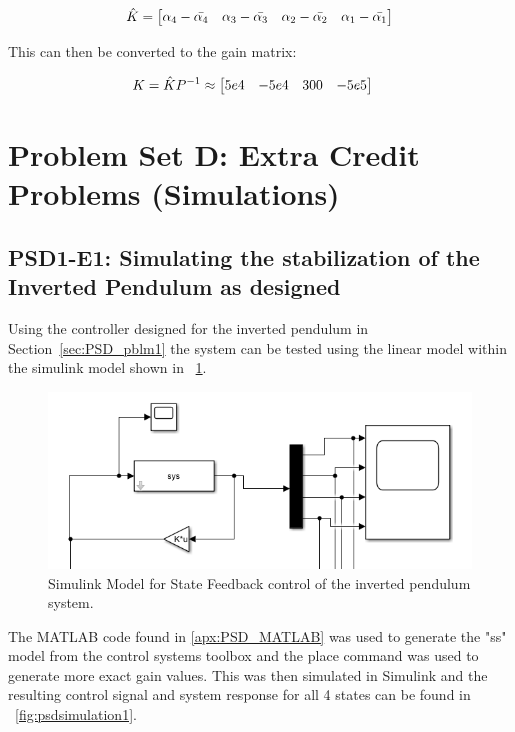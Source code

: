 \documentclass[]{article}
\newcommand{\sectionname}{Section}
\begin{document}
		\begin{equation}
			\hat{K} = \mqty[\alpha_4 - \bar{\alpha_4} & \alpha_3 - \bar{\alpha_3} & \alpha_2 - \bar{\alpha_2} & \alpha_1 - \bar{\alpha_1}]
		\end{equation}
		
		This can then be converted to the gain matrix:
		
		\begin{equation}
			\begin{aligned}
				K &= \hat{K} P^{-1} \approx \mqty[5e4&-5e4&300&-5e5] 
			\end{aligned}
			\label{eq:pendulum_state_feedback_K}
		\end{equation}





\newpage
\appendix

\section{Problem Set D: Extra Credit Problems (Simulations)}

	\subsection{PSD1-E1: Simulating the stabilization of the Inverted Pendulum as designed}
		Using the controller designed for the inverted pendulum in \sectionname \ \ref{sec:PSD_pblm1} the system can be tested using the linear model within the simulink model shown in \figurename \ \ref{fig:psdsimulinkmodel1}.
		
		\begin{figure}[h]
			\centering
			\includegraphics[width=1\linewidth]{Fig/PSD_SimulinkModel_1}
			\caption{Simulink Model for State Feedback control of the inverted pendulum system.}
			\label{fig:psdsimulinkmodel1}
		\end{figure}
		
		The MATLAB code found in \appendixname \ref{apx:PSD_MATLAB} was used to generate the "ss" model from the control systems toolbox and the place command was used to generate more exact gain values. This was then simulated in Simulink and the resulting control signal and system response for all 4 states can be found in \figurename \ \ref{fig:psdsimulation1}.
		
\end{document}
